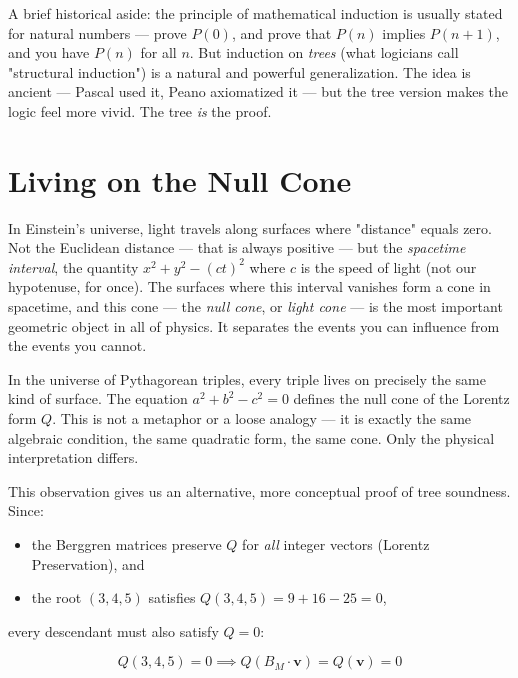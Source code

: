 A brief historical aside: the principle of mathematical induction is usually stated for natural numbers --- prove $P(0)$, and prove that $P(n)$ implies $P(n+1)$, and you have $P(n)$ for all $n$. But induction on \textit{trees} (what logicians call "structural induction") is a natural and powerful generalization. The idea is ancient --- Pascal used it, Peano axiomatized it --- but the tree version makes the logic feel more vivid. The tree \textit{is} the proof.


\ornbreak



\section{Living on the Null Cone}


In Einstein's universe, light travels along surfaces where "distance" equals zero. Not the Euclidean distance --- that is always positive --- but the \textit{spacetime interval}, the quantity $x^2 + y^2 - (ct)^2$ where $c$ is the speed of light (not our hypotenuse, for once). The surfaces where this interval vanishes form a cone in spacetime, and this cone --- the \textit{null cone}, or \textit{light cone} --- is the most important geometric object in all of physics. It separates the events you can influence from the events you cannot.

In the universe of Pythagorean triples, every triple lives on precisely the same kind of surface. The equation $a^2 + b^2 - c^2 = 0$ defines the null cone of the Lorentz form $Q$. This is not a metaphor or a loose analogy --- it is exactly the same algebraic condition, the same quadratic form, the same cone. Only the physical interpretation differs.

This observation gives us an alternative, more conceptual proof of tree soundness. Since:

\begin{itemize}[leftmargin=*]
\item the Berggren matrices preserve $Q$ for \textit{all} integer vectors (Lorentz Preservation), and
\item the root $(3, 4, 5)$ satisfies $Q(3, 4, 5) = 9 + 16 - 25 = 0$,
\end{itemize}

every descendant must also satisfy $Q = 0$:

\[
Q(3, 4, 5) = 0 \implies Q(B_M \cdot \mathbf{v}) = Q(\mathbf{v}) = 0
\]

